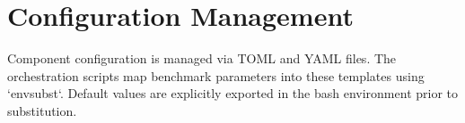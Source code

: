 \section{Configuration Management}
\label{sec:configuration_management}
Component configuration is managed via TOML and YAML files. The orchestration scripts map benchmark parameters into these templates using `envsubst`. Default values are explicitly exported in the bash environment prior to substitution.